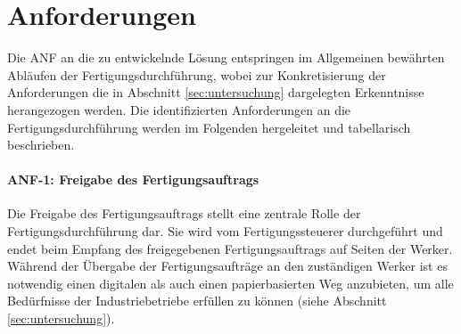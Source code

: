 \section{Anforderungen}\label{sec:anforderungen}
Die \ac{ANF} an die zu entwickelnde Lösung entspringen im Allgemeinen bewährten Abläufen der Fertigungsdurchführung, wobei zur Konkretisierung der Anforderungen die in Abschnitt \ref{sec:untersuchung} dargelegten Erkenntnisse herangezogen werden. Die identifizierten Anforderungen an die Fertigungsdurchführung werden im Folgenden hergeleitet und tabellarisch beschrieben.

\paragraph{ANF-1: Freigabe des Fertigungsauftrags}
Die Freigabe des Fertigungsauftrags stellt eine zentrale Rolle der Fertigungsdurchführung dar. 
Sie wird vom Fertigungssteuerer durchgeführt und endet beim Empfang des freigegebenen Fertigungsauftrags auf Seiten der Werker.  Während der Übergabe der Fertigungsaufträge an den zuständigen Werker ist es notwendig einen digitalen als auch einen papierbasierten Weg anzubieten, um alle Bedürfnisse der Industriebetriebe erfüllen zu können (siehe Abschnitt \ref{sec:untersuchung}).

